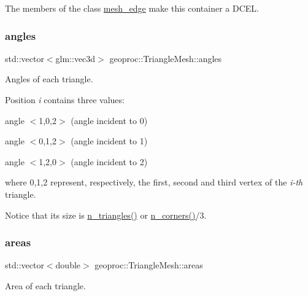 The members of the class \hyperlink{classgeoproc_1_1mesh__edge}{mesh\+\_\+edge} make this container a D\+C\+EL. \mbox{\label{classgeoproc_1_1TriangleMesh_a50b5456f546551aa39d68487614d7720}} 
\subsubsection{\texorpdfstring{angles}{angles}}
{\footnotesize\ttfamily std\+::vector$<$glm\+::vec3d$>$ geoproc\+::\+Triangle\+Mesh\+::angles\hspace{0.3cm}{\ttfamily [protected]}}



Angles of each triangle. 

Position {\itshape i} contains three values\+:
\begin{DoxyItemize}
\item angle $<$1,0,2$>$ (angle incident to 0)
\item angle $<$0,1,2$>$ (angle incident to 1)
\item angle $<$1,2,0$>$ (angle incident to 2)
\end{DoxyItemize}

where 0,1,2 represent, respectively, the first, second and third vertex of the {\itshape i-\/th} triangle.

Notice that its size is \hyperlink{classgeoproc_1_1TriangleMesh_ac6db86ebd1e12d187f4bd4fcbb1e0809}{n\+\_\+triangles()} or \hyperlink{classgeoproc_1_1TriangleMesh_a6b8c186ba032170de9d4f36b4c1d298b}{n\+\_\+corners()}/3. \mbox{\label{classgeoproc_1_1TriangleMesh_a134859a7251c2ae7c8b64b2e44e8ad0e}} 
\subsubsection{\texorpdfstring{areas}{areas}}
{\footnotesize\ttfamily std\+::vector$<$double$>$ geoproc\+::\+Triangle\+Mesh\+::areas\hspace{0.3cm}{\ttfamily [protected]}}



Area of each triangle. 

